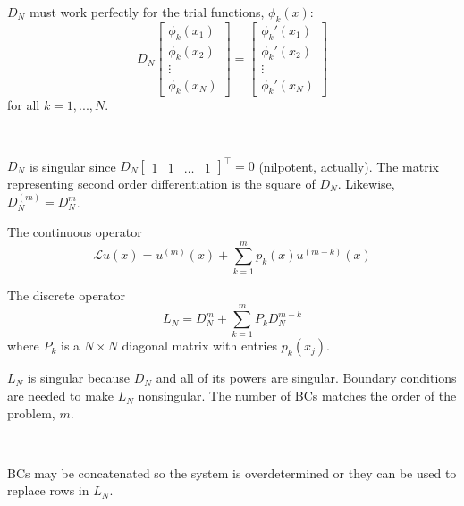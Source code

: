 \documentclass{beamer}
\begin{document}
\begin{frame}

$D_N$ must work perfectly for the trial functions, $\phi_k(x)$:
\begin{equation*}
D_N \begin{bmatrix}
\phi_k(x_1) \\ \phi_k(x_2) \\ \vdots \\ \phi_k(x_N)
\end{bmatrix} = \begin{bmatrix}
\phi_k'(x_1) \\ \phi_k'(x_2) \\ \vdots \\ \phi_k'(x_N)
\end{bmatrix}
\end{equation*}
for all $k = 1,...,N$.

~

$D_N$ is singular since $D_N \begin{bmatrix} 1 & 1 & \dots & 1 \end{bmatrix}^\top = 0$ (nilpotent, actually).
The matrix representing second order differentiation is the square of $D_N$.
Likewise, $D^{(m)}_N = D^m_N$.
\end{frame}

\begin{frame}

\begin{block}{The continuous operator}
\begin{equation*}
\mathcal{L} u(x) = u^{(m)}(x) + \sum_{k=1}^m p_k(x) u^{(m-k)}(x)
\end{equation*}
\end{block}
\begin{block}{The discrete operator}
\begin{equation*}
L_N = D^m_N + \sum_{k=1}^m P_k D^{m-k}_N
\end{equation*}
where $P_k$ is a $N \times N$ diagonal matrix with entries $p_k(x_j)$.
\end{block}

\end{frame}

\begin{frame}
$L_N$ is singular because $D_N$ and all of its powers are singular.
Boundary conditions are needed to make $L_N$ nonsingular.
The number of BCs matches the order of the problem, $m$.

~

BCs may be concatenated so the system is overdetermined or they can be used to replace rows in $L_N$.
\end{frame}
\end{document}
